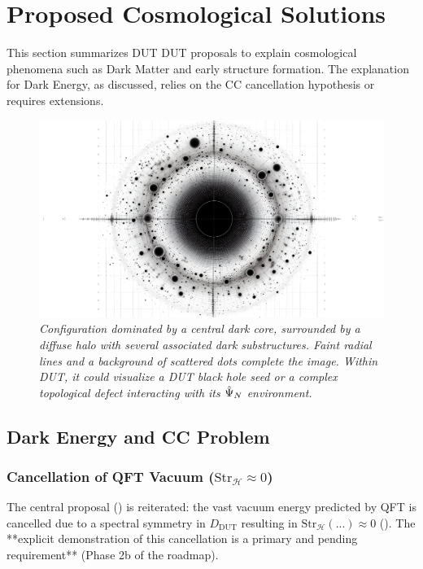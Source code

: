 \documentclass[11pt, a4paper]{article}
\theoremstyle{remark}
\newcommand{\Op}[1]{\hat{#1}}
\newcommand{\Str}{\mathrm{Str}}
\begin{document}
\section{Proposed Cosmological Solutions }
\label{sec:cosmological_solutions_final_revised}

This section summarizes DUT DUT proposals to explain cosmological phenomena such as Dark Matter and early structure formation. The explanation for Dark Energy, as discussed, relies on the CC cancellation hypothesis or requires extensions.

\begin{figure}[htbp]
    \centering
    \includegraphics[width=0.6\linewidth]{OIG34.ZNLJ.PNG}
    \caption{%
       \footnotesize\textit{Configuration dominated by a central dark core, surrounded by a diffuse halo with several associated dark substructures. Faint radial lines and a background of scattered dots complete the image. Within DUT, it could visualize a DUT black hole seed or a complex topological defect interacting with its \(\protect\Op{\Psi}_N\) environment.}
    }
    \label{fig:Figura12}
\end{figure}

\subsection{Dark Energy and CC Problem }
\label{subsec:dark_energy_final_revised}

\subsubsection{Cancellation of QFT Vacuum (\texorpdfstring{$\Str_{\mathcal{H}} \approx 0$}{Str=0})}
\label{sec:cancelacion_vacio_final_revised}
The central proposal () is reiterated: the vast vacuum energy predicted by QFT is cancelled due to a spectral symmetry in \( D_{\text{DUT}} \) resulting in \( \Str_{\mathcal{H}}(...) \approx 0 \) (). The **explicit demonstration of this cancellation is a primary and pending requirement** (Phase 2b of the roadmap).
\end{document}
